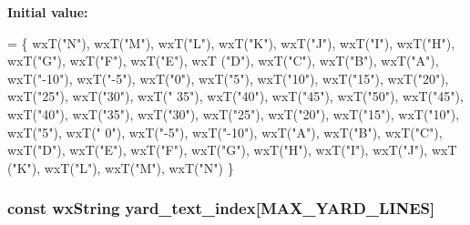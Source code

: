 {\bfseries Initial value\-:}
\begin{DoxyCode}
=
\{
    wxT(\textcolor{stringliteral}{"N"}), wxT(\textcolor{stringliteral}{"M"}), wxT(\textcolor{stringliteral}{"L"}), wxT(\textcolor{stringliteral}{"K"}), wxT(\textcolor{stringliteral}{"J"}), wxT(\textcolor{stringliteral}{"I"}), wxT(\textcolor{stringliteral}{"H"}), wxT(\textcolor{stringliteral}{"G"}), wxT(\textcolor{stringliteral}{"F"}), wxT(\textcolor{stringliteral}{"E"}), wxT
      (\textcolor{stringliteral}{"D"}), wxT(\textcolor{stringliteral}{"C"}), wxT(\textcolor{stringliteral}{"B"}), wxT(\textcolor{stringliteral}{"A"}),
    wxT(\textcolor{stringliteral}{"-10"}), wxT(\textcolor{stringliteral}{"-5"}), wxT(\textcolor{stringliteral}{"0"}), wxT(\textcolor{stringliteral}{"5"}), wxT(\textcolor{stringliteral}{"10"}), wxT(\textcolor{stringliteral}{"15"}), wxT(\textcolor{stringliteral}{"20"}), wxT(\textcolor{stringliteral}{"25"}), wxT(\textcolor{stringliteral}{"30"}), wxT(\textcolor{stringliteral}{"
      35"}), wxT(\textcolor{stringliteral}{"40"}), wxT(\textcolor{stringliteral}{"45"}), wxT(\textcolor{stringliteral}{"50"}),
    wxT(\textcolor{stringliteral}{"45"}), wxT(\textcolor{stringliteral}{"40"}), wxT(\textcolor{stringliteral}{"35"}), wxT(\textcolor{stringliteral}{"30"}), wxT(\textcolor{stringliteral}{"25"}), wxT(\textcolor{stringliteral}{"20"}), wxT(\textcolor{stringliteral}{"15"}), wxT(\textcolor{stringliteral}{"10"}), wxT(\textcolor{stringliteral}{"5"}), wxT(\textcolor{stringliteral}{"
      0"}), wxT(\textcolor{stringliteral}{"-5"}), wxT(\textcolor{stringliteral}{"-10"}),
    wxT(\textcolor{stringliteral}{"A"}), wxT(\textcolor{stringliteral}{"B"}), wxT(\textcolor{stringliteral}{"C"}), wxT(\textcolor{stringliteral}{"D"}), wxT(\textcolor{stringliteral}{"E"}), wxT(\textcolor{stringliteral}{"F"}), wxT(\textcolor{stringliteral}{"G"}), wxT(\textcolor{stringliteral}{"H"}), wxT(\textcolor{stringliteral}{"I"}), wxT(\textcolor{stringliteral}{"J"}), wxT
      (\textcolor{stringliteral}{"K"}), wxT(\textcolor{stringliteral}{"L"}), wxT(\textcolor{stringliteral}{"M"}), wxT(\textcolor{stringliteral}{"N"})
\}
\end{DoxyCode}
\hypertarget{a00190_a8c16498e1a7dfff8f07c031d6795f940}{
\subsubsection[{yard\-\_\-text\-\_\-index}]{\setlength{\rightskip}{0pt plus 5cm}const wx\-String yard\-\_\-text\-\_\-index\mbox{[}{\bf M\-A\-X\-\_\-\-Y\-A\-R\-D\-\_\-\-L\-I\-N\-E\-S}\mbox{]}}}\label{a00190_a8c16498e1a7dfff8f07c031d6795f940}
